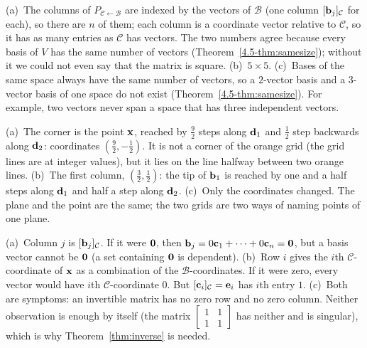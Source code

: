 \documentclass[11pt]{article}
\begin{document}
\begin{description}[leftmargin=0pt,itemsep=5pt]
  \item[Pause and think \ref{think:square}.] (a)~The columns of $P_{\mathcal{C}\leftarrow\mathcal{B}}$ are indexed by the vectors of $\mathcal{B}$ (one column $[\mathbf{b}_j]_{\mathcal{C}}$ for each), so there are $n$ of them; each column is a coordinate vector relative to $\mathcal{C}$, so it has as many entries as $\mathcal{C}$ has vectors. The two numbers agree because every basis of $V$ has the same number of vectors (Theorem~\ref{4.5-thm:samesize}); without it we could not even say that the matrix is square. (b)~$5\times5$. (c)~Bases of the same space always have the same number of vectors, so a $2$-vector basis and a $3$-vector basis of one space do not exist (Theorem~\ref{4.5-thm:samesize}). For example, two vectors never span a space that has three independent vectors.
  \item[Pause and think \ref{think:grids}.] (a)~The corner is the point $\mathbf{x}$, reached by $\tfrac92$ steps along $\mathbf{d}_1$ and $\tfrac12$ step backwards along $\mathbf{d}_2$: coordinates $(\tfrac92,-\tfrac12)$. It is not a corner of the orange grid (the grid lines are at integer values), but it lies on the line halfway between two orange lines. (b)~The first column, $(\tfrac32,\tfrac12)$: the tip of $\mathbf{b}_1$ is reached by one and a half steps along $\mathbf{d}_1$ and half a step along $\mathbf{d}_2$. (c)~Only the coordinates changed. The plane and the point are the same; the two grids are two ways of naming points of one plane.
  \item[Pause and think \ref{think:rows}.] (a)~Column $j$ is $[\mathbf{b}_j]_{\mathcal{C}}$. If it were $\mathbf{0}$, then $\mathbf{b}_j=0\mathbf{c}_1+\cdots+0\mathbf{c}_n=\mathbf{0}$, but a basis vector cannot be $\mathbf{0}$ (a set containing $\mathbf{0}$ is dependent). (b)~Row $i$ gives the $i$th $\mathcal{C}$-coordinate of $\mathbf{x}$ as a combination of the $\mathcal{B}$-coordinates. If it were zero, every vector would have $i$th $\mathcal{C}$-coordinate $0$. But $[\mathbf{c}_i]_{\mathcal{C}}=\mathbf{e}_i$ has $i$th entry $1$. (c)~Both are symptoms: an invertible matrix has no zero row and no zero column. Neither observation is enough by itself (the matrix $\begin{bmatrix}1&1\\1&1\end{bmatrix}$ has neither and is singular), which is why Theorem~\ref{thm:inverse} is needed.

\end{description}
\end{document}
